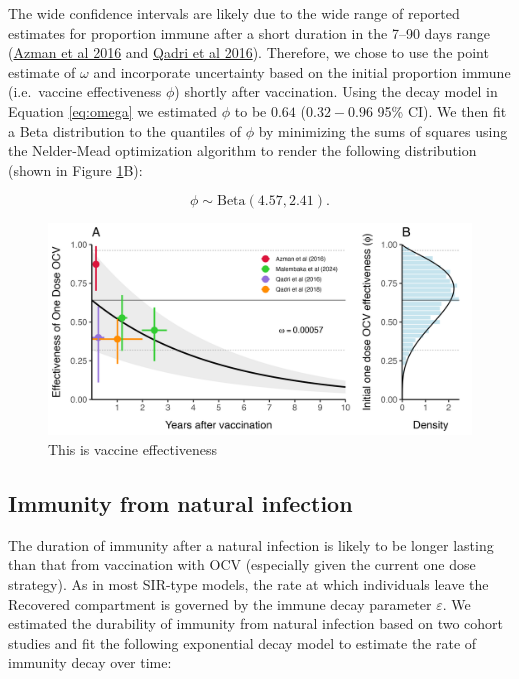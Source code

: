 \documentclass[
]{book}
\begin{document}
The wide confidence intervals are likely due to the wide range of reported estimates for proportion immune after a short duration in the 7--90 days range (\href{https://www.thelancet.com/journals/langlo/article/PIIS2214-109X(16)30211-X/fulltext}{Azman et al 2016} and \href{https://www.nejm.org/doi/full/10.1056/NEJMoa1510330}{Qadri et al 2016}). Therefore, we chose to use the point estimate of \(\omega\) and incorporate uncertainty based on the initial proportion immune (i.e.~vaccine effectiveness \(\phi\)) shortly after vaccination. Using the decay model in Equation \eqref{eq:omega} we estimated \(\phi\) to be \(0.64\) (\(0.32-0.96\) 95\% CI). We then fit a Beta distribution to the quantiles of \(\phi\) by minimizing the sums of squares using the Nelder-Mead optimization algorithm to render the following distribution (shown in Figure \ref{fig:effectiveness}B):

\begin{equation} 
\phi \sim \text{Beta}(4.57, 2.41).
\label{eq:effectiveness}
\end{equation}

\begin{figure}

{\centering \includegraphics[width=1.02\linewidth]{figures/vaccine_effectiveness} 

}

\caption{This is vaccine effectiveness}\label{fig:effectiveness}
\end{figure}

\subsection{Immunity from natural infection}\label{immunity-from-natural-infection}

The duration of immunity after a natural infection is likely to be longer lasting than that from vaccination with OCV (especially given the current one dose strategy). As in most SIR-type models, the rate at which individuals leave the Recovered compartment is governed by the immune decay parameter \(\varepsilon\). We estimated the durability of immunity from natural infection based on two cohort studies and fit the following exponential decay model to estimate the rate of immunity decay over time:
\end{document}
